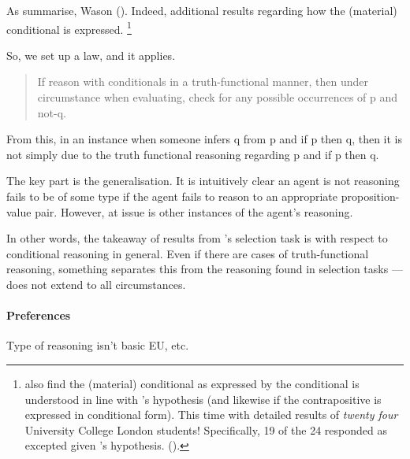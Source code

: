 \begin{note}
  As \citeauthor{Johnson-Laird:1969aa} summarise, Wason  (\citeyear[367]{Johnson-Laird:1969aa}).
  Indeed, \citeauthor{Johnson-Laird:1969aa} additional results regarding how the (material) conditional is expressed.%
  \footnote{
    \citeauthor{Johnson-Laird:1969aa} also find the (material) conditional as expressed by the conditional is understood in line with \citeauthor{Wason:1966aa}'s hypothesis (and likewise if the contrapositive is expressed in conditional form).
    This time with detailed results of \emph{twenty four} University College London students!
    Specifically, 19 of the 24 responded as excepted given \citeauthor{Wason:1966aa}'s hypothesis.
    (\citeyear[369,370]{Johnson-Laird:1969aa}).
  }
\end{note}

\begin{note}
  So, we set up a law, and it applies.

  \begin{quote}
    If reason with conditionals in a truth-functional manner, then under circumstance when evaluating, check for any possible occurrences of p and not-q.
  \end{quote}

  From this, in an instance when someone infers q from p and if p then q, then it is not simply due to the truth functional reasoning regarding p and if p then q.

  The key part is the generalisation.
  It is intuitively clear an agent is not reasoning fails to be of some type if the agent fails to reason to an appropriate proposition-value pair.
  However, at issue is other instances of the agent's reasoning.

  In other words, the takeaway of results from \citeauthor{Wason:1966aa}'s selection task is with respect to conditional reasoning in general.
  Even if there are cases of truth-functional reasoning, something separates this from the reasoning found in selection tasks --- does not extend to all circumstances.
\end{note}

\paragraph*{Preferences}

\begin{note}
  Type of reasoning isn't basic EU, etc.
\end{note}

